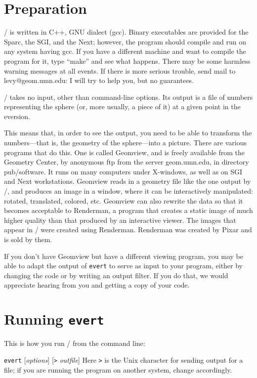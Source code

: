 \section*{Preparation}

\Ev/ is written in C++, GNU dialect (gcc). Binary executables are provided for the Sparc, the SGI, and the Next; however, the program should compile and
run on any system having gcc. If you have a different machine and want to compile the program for it, type ``make'' and see what happens. There may be some
harmless warning messages at all events. If there is more serious trouble, send mail to levy@geom.umn.edu: I will try to help you, but no guarantees.

\Ev/ takes no input, other than command-line options. Its output is a file of numbers representing the sphere (or, more usually, a piece of it) at a given point in the eversion.

This means that, in order to see the output, you need to be able to transform the numbers---that is, the geometry of the sphere---into a
picture. There are various programs that do this. One is called Geomview, and is freely available from the Geometry Center, by
anonymous ftp from the server geom.umn.edu, in directory pub/software. It runs on many computers under X-windows, as well as on SGI and Next
workstations. Geomview reads in a geometry file like the one output by \ev/, and produces an image in a window, where it can be
interactively manipulated: rotated, translated, colored, etc. Geomview can also rewrite the data so that it becomes acceptable to
Renderman, a program that creates a static image of much higher quality than that produced by an interactive viewer. The images that
appear in \OI/ were created using Renderman. Renderman was created by Pixar and is sold by them.

If you don't have Geomview but have a different viewing program, you may be able to adapt the output of {\tt evert} to serve as input to
your program, either by changing the code or by writing an output filter. If you do that, we would appreciate hearing from you and getting a copy of your code.

\section*{Running {\tt evert}}

This is how you run \ev/ from the command line:

\smallbreak
{\tt evert} [{\it options\/}] [{\tt >} {\it outfile}]
\smallbreak\noindent
Here {\tt >} is the Unix character for sending output for a file; if you are running the program on another system, change accordingly.

